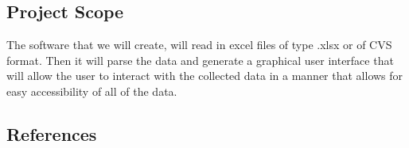 \subsection{Project Scope}

The software that we will create, will read in excel files of type .xlsx or of CVS format. Then it will parse the data and generate a graphical user interface that will allow the user to interact with the collected data in a manner that allows for easy accessibility of all of the data.

\subsection{References}

